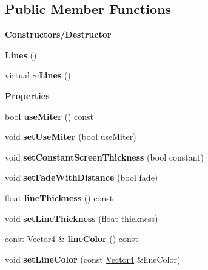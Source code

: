 \subsection*{Public Member Functions}
\begin{Indent}\textbf{ Constructors/\+Destructor}\par
\begin{DoxyCompactItemize}
\item 
\mbox{\label{classrev_1_1_lines_a886da7c41d0dc52783bd9c0c684c4cb0}} 
{\bfseries Lines} ()
\item 
\mbox{\label{classrev_1_1_lines_afb40a307bf76c3f68ae483789adac9f4}} 
virtual {\bfseries $\sim$\+Lines} ()
\end{DoxyCompactItemize}
\end{Indent}
\begin{Indent}\textbf{ Properties}\par
\begin{DoxyCompactItemize}
\item 
\mbox{\label{classrev_1_1_lines_a4ff63ec3b8ab90240f1de0076883aef2}} 
bool {\bfseries use\+Miter} () const
\item 
\mbox{\label{classrev_1_1_lines_a33145c647ab0d8804ac37ac476570aa8}} 
void {\bfseries set\+Use\+Miter} (bool use\+Miter)
\item 
\mbox{\label{classrev_1_1_lines_a7bc74dadc3857e85c41a9e90b9250ea6}} 
void {\bfseries set\+Constant\+Screen\+Thickness} (bool constant)
\item 
\mbox{\label{classrev_1_1_lines_a9052ef1ce10d921063ea07ce479ffb2b}} 
void {\bfseries set\+Fade\+With\+Distance} (bool fade)
\item 
\mbox{\label{classrev_1_1_lines_ad258d70af65ea57f6e5c8a2c92ec4905}} 
float {\bfseries line\+Thickness} () const
\item 
\mbox{\label{classrev_1_1_lines_a795616d718589973631dc609c88b2ba5}} 
void {\bfseries set\+Line\+Thickness} (float thickness)
\item 
\mbox{\label{classrev_1_1_lines_ab6527edf962f39c50fca7d6c324e4235}} 
const \mbox{\hyperlink{classrev_1_1_vector}{Vector4}} \& {\bfseries line\+Color} () const
\item 
\mbox{\label{classrev_1_1_lines_ad8230a2d6bcb1cfa9b6fd0b25b9c3aa4}} 
void {\bfseries set\+Line\+Color} (const \mbox{\hyperlink{classrev_1_1_vector}{Vector4}} \&line\+Color)
\end{DoxyCompactItemize}
\end{Indent}
